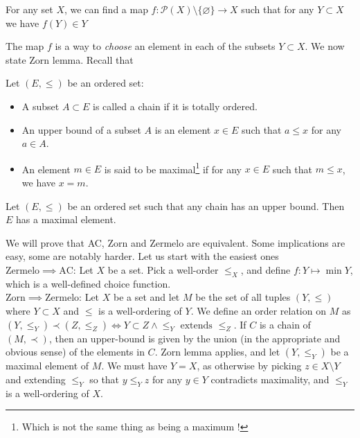 \documentclass{article}
\begin{document}
\begin{axiom}
    For any set $X$, we can find a map $f: \mathcal{P}(X)\setminus\{\varnothing\} \to X$ such that for any $Y \subset X$ we have $f(Y) \in Y$
\end{axiom}
The map $f$ is a way to \textit{choose} an element in each of the subsets $Y \subset X$.
We now state Zorn lemma. Recall that

\begin{definition}
Let $(E, \leq)$ be an ordered set:
\begin{itemize}
    \item A subset $A \subset E$ is called a chain if it is totally ordered.
    \item An upper bound of a subset $A$ is an element $x \in E$ such that $a \leq x$ for any $a \in A$.
    \item An element $m \in E$ is said to be maximal\footnote{Which is not the same thing as being a maximum !} if for any $x \in E$ such that $m \leq x$, we have $x = m$.
\end{itemize}  
\end{definition}

\begin{theorem}
    Let $(E, \leq)$ be an ordered set such that any chain has an upper bound. Then $E$ has a maximal element.
\end{theorem}

We will prove that AC, Zorn and Zermelo are equivalent. Some implications are easy, some are notably harder. Let us start with the easiest ones \\

$\mathrm{Zermelo} \implies \mathrm{AC}$: Let $X$ be a set. Pick a well-order $\leq_X$, and define $f: Y \mapsto \min Y$, which is a well-defined choice function.\\

$\mathrm{Zorn} \implies \mathrm{Zermelo}$: Let $X$ be a set and let $M$ be the set of all tuples $(Y, \leq)$ where $Y \subset X$ and $\leq$ is a well-ordering of $Y$. We define an order relation on $M$ as $(Y, \leq_Y) \prec (Z, \leq_Z) \iff Y \subset Z \land \leq_Y \text{ extends } \leq_Z$. If $C$ is a chain of $(M, \prec)$, then an upper-bound is given by the union (in the appropriate and obvious sense) of the elements in $C$. Zorn lemma applies, and let $(Y, \leq_Y)$ be a maximal element of $M$. We must have $Y = X$, as otherwise by picking $z \in X \setminus Y$ and extending $\leq_Y$ so that $y \leq_Y z$ for any $y \in Y$ contradicts maximality, and $\leq_Y$ is a well-ordering of $X$.\\
\end{document}
